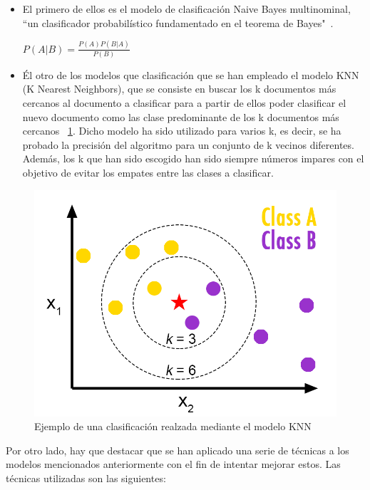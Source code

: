 \documentclass[conference,a4paper]{IEEEtran}
\begin{document}
\begin{itemize}
\item El primero de ellos es el modelo de clasificación Naive Bayes multinominal, ``un clasificador probabilístico fundamentado en el teorema de Bayes"~\cite{b3}.
\newline

\begin{center}
$ P(A|B) =  \frac{P(A)P(B|A)}{P(B)} $\\
\end{center}

\item Él otro de los modelos que clasificación que se han empleado el modelo KNN (K Nearest Neighbors), que se consiste en buscar los k documentos más cercanos al documento a clasificar para a partir de ellos poder clasificar el nuevo documento como las clase predominante de los k documentos más cercanos ~\ref{fig:knn}. Dicho modelo ha sido utilizado para varios k, es decir, se ha probado la precisión del algoritmo para un conjunto de k vecinos diferentes. Además, los k que han sido escogido han sido siempre números impares con el objetivo de evitar los empates entre las clases a clasificar.
\end{itemize}


\begin{figure}
  \centering
  \includegraphics[scale=0.25]{knn}
  \caption{Ejemplo de una clasificación realzada mediante el modelo KNN}
  \label{fig:knn}
\end{figure}

Por otro lado, hay que destacar que se han aplicado una serie de técnicas a los modelos mencionados anteriormente con el fin de intentar mejorar estos. Las técnicas utilizadas son las siguientes:
                          
\end{document}
